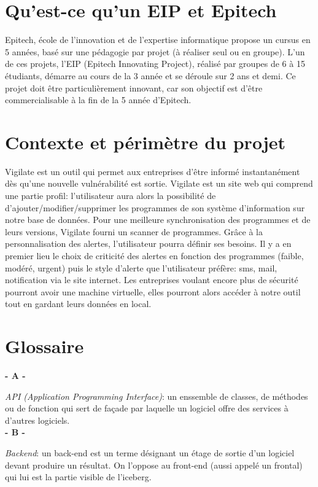 \section{Qu'est-ce qu’un EIP et Epitech}
Epitech, école de l'innovation et de l'expertise informatique propose un cursus en 5 années, basé sur une pédagogie par projet (à réaliser seul ou en groupe). L'un de ces projets, l’EIP (Epitech Innovating Project), réalisé par groupes de 6 à 15 étudiants, démarre au cours de la 3\ieme{} année et se déroule sur 2 ans et demi. Ce projet doit être particulièrement innovant, car son objectif est d’être commercialisable à la fin de la 5\ieme{} année d’Epitech.

\section{Contexte et périmètre du projet}
Vigilate est un outil qui permet aux entreprises d'être informé instantanément dès qu'une nouvelle vulnérabilité est sortie. Vigilate est un site web qui comprend une partie profil: l'utilisateur aura alors la possibilité de d'ajouter/modifier/supprimer les programmes de son système d'information sur notre base de données. Pour une meilleure synchronisation des programmes et de leurs versions, Vigilate fourni un scanner de programmes. Grâce à la personnalisation des alertes, l'utilisateur pourra définir ses besoins. Il y a en premier lieu le choix de criticité des alertes en fonction des programmes (faible, modéré, urgent) puis le style d'alerte que l'utilisateur préfère: sms, mail, notification via le site internet. Les entreprises voulant encore plus de sécurité pourront avoir une machine virtuelle, elles pourront alors accéder à notre outil tout en gardant leurs données en local.


\section{Glossaire}
\noindent

\vskip 0.1cm
\textbf{- A -}\\
\vskip 0.1cm

\textit{API (Application Programming Interface)}: un enssemble de classes, de méthodes ou de fonction qui sert de façade par laquelle un logiciel offre des services à d'autres logiciels.\\

\vskip 0.1cm
\textbf{- B -}\\
\vskip 0.1cm

\textit{Backend}: un back-end est un terme désignant un étage de sortie d'un logiciel devant produire un résultat. On l'oppose au front-end (aussi appelé un frontal) qui lui est la partie visible de l'iceberg.\\

